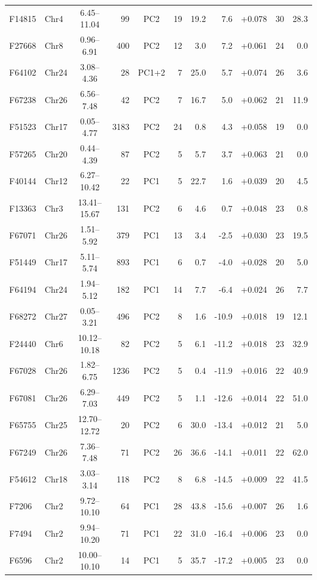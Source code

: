 \documentclass[border=12pt]{standalone}
\begin{document}
\begin{minipage}{18.5cm}
\begin{center}
\begin{tabular}{@{}l l c r c r r r r r r@{}}
F14815 & Chr4 & 6.45--11.04 & 99 & PC2 & 19 & 19.2 & 7.6 & +0.078 & 30 & 28.3 \\
F27668 & Chr8 & 0.96--6.91 & 400 & PC2 & 12 & 3.0 & 7.2 & +0.061 & 24 & 0.0 \\
F64102 & Chr24 & 3.08--4.36 & 28 & PC1+2 & 7 & 25.0 & 5.7 & +0.074 & 26 & 3.6 \\
F67238 & Chr26 & 6.56--7.48 & 42 & PC2 & 7 & 16.7 & 5.0 & +0.062 & 21 & 11.9 \\
F51523 & Chr17 & 0.05--4.77 & 3183 & PC2 & 24 & 0.8 & 4.3 & +0.058 & 19 & 0.0 \\
F57265 & Chr20 & 0.44--4.39 & 87 & PC2 & 5 & 5.7 & 3.7 & +0.063 & 21 & 0.0 \\
F40144 & Chr12 & 6.27--10.42 & 22 & PC1 & 5 & 22.7 & 1.6 & +0.039 & 20 & 4.5 \\
F13363 & Chr3 & 13.41--15.67 & 131 & PC2 & 6 & 4.6 & 0.7 & +0.048 & 23 & 0.8 \\
F67071 & Chr26 & 1.51--5.92 & 379 & PC1 & 13 & 3.4 & -2.5 & +0.030 & 23 & 19.5 \\
F51449 & Chr17 & 5.11--5.74 & 893 & PC1 & 6 & 0.7 & -4.0 & +0.028 & 20 & 5.0 \\
F64194 & Chr24 & 1.94--5.12 & 182 & PC1 & 14 & 7.7 & -6.4 & +0.024 & 26 & 7.7 \\
F68272 & Chr27 & 0.05--3.21 & 496 & PC2 & 8 & 1.6 & -10.9 & +0.018 & 19 & 12.1 \\
F24440 & Chr6 & 10.12--10.18 & 82 & PC2 & 5 & 6.1 & -11.2 & +0.018 & 23 & 32.9 \\
F67028 & Chr26 & 1.82--6.75 & 1236 & PC2 & 5 & 0.4 & -11.9 & +0.016 & 22 & 40.9 \\
F67081 & Chr26 & 6.29--7.03 & 449 & PC2 & 5 & 1.1 & -12.6 & +0.014 & 22 & 51.0 \\
F65755 & Chr25 & 12.70--12.72 & 20 & PC2 & 6 & 30.0 & -13.4 & +0.012 & 21 & 5.0 \\
F67249 & Chr26 & 7.36--7.48 & 71 & PC2 & 26 & 36.6 & -14.1 & +0.011 & 22 & 62.0 \\
F54612 & Chr18 & 3.03--3.14 & 118 & PC2 & 8 & 6.8 & -14.5 & +0.009 & 22 & 41.5 \\
F7206 & Chr2 & 9.72--10.10 & 64 & PC1 & 28 & 43.8 & -15.6 & +0.007 & 26 & 1.6 \\
F7494 & Chr2 & 9.94--10.20 & 71 & PC1 & 22 & 31.0 & -16.4 & +0.006 & 23 & 0.0 \\
F6596 & Chr2 & 10.00--10.10 & 14 & PC1 & 5 & 35.7 & -17.2 & +0.005 & 23 & 0.0 \\
\bottomrule
\end{tabular}
\end{center}


\end{minipage}
\end{document}
